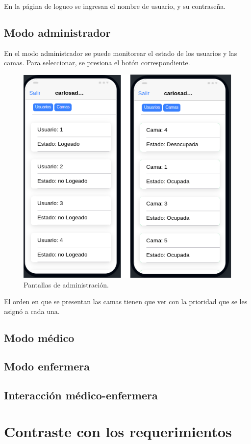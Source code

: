 En la página de logueo se ingresan el nombre de usuario, y su contraseña.


\subsection{Modo administrador}
En el modo administrador se puede monitorear el estado de los usuarios y las camas. Para seleccionar, se presiona el botón correspondiente.

\begin{figure}[ht]
	\centering
	\includegraphics[scale=.70]{./Figures/app/administracion.png}
	\caption{ Pantallas de administración.}
	\label{fig: Pantallas de administración.}
\end{figure} 

El orden en que se presentan las camas tienen que ver con la prioridad que se les asignó a cada una.



\pagebreak
\subsection{Modo médico}
\pagebreak
\subsection{Modo enfermera}
\pagebreak
\subsection{Interacción médico-enfermera}
\pagebreak
\section{Contraste con los requerimientos}

